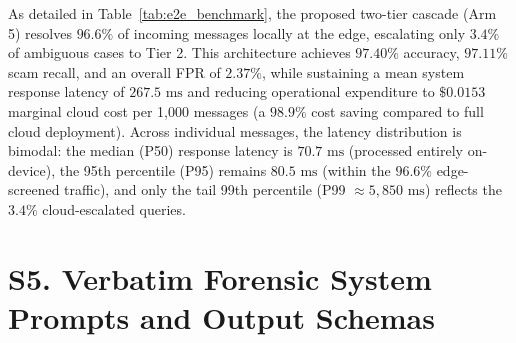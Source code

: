 \documentclass[journal]{IEEEtran}
\begin{document}
As detailed in Table~\ref{tab:e2e_benchmark}, the proposed two-tier cascade (Arm 5) resolves $96.6\%$ of incoming messages locally at the edge, escalating only $3.4\%$ of ambiguous cases to Tier 2. This architecture achieves $97.40\%$ accuracy, $97.11\%$ scam recall, and an overall FPR of $2.37\%$, while sustaining a mean system response latency of $267.5\text{ ms}$ and reducing operational expenditure to $\$0.0153$ marginal cloud cost per 1,000 messages (a $98.9\%$ cost saving compared to full cloud deployment). Across individual messages, the latency distribution is bimodal: the median (P50) response latency is $70.7\text{ ms}$ (processed entirely on-device), the 95th percentile (P95) remains $80.5\text{ ms}$ (within the $96.6\%$ edge-screened traffic), and only the tail 99th percentile (P99 $\approx 5,850\text{ ms}$) reflects the $3.4\%$ cloud-escalated queries.

\begin{table}[h]
\centering
\caption{Supplementary Table S4: Exploratory Routing Threshold Sensitivity Profiling Across $\tau \in [0.70, 0.95]$}
\label{tab:tau_ablation}
\end{table}

\section{S5. Verbatim Forensic System Prompts and Output Schemas}
\label{sec:supp_prompts}
\end{document}
